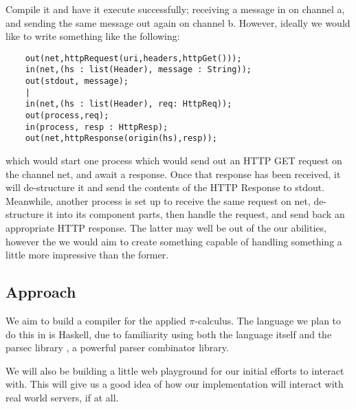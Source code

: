 Compile it and have it execute successfully; receiving a message in on channel a, and sending the same message out again on channel b. However, ideally we would like to write something like the following:
\begin{verbatim}
    out(net,httpRequest(uri,headers,httpGet()));
    in(net,(hs : list(Header), message : String));
    out(stdout, message);
    |
    in(net,(hs : list(Header), req: HttpReq));
    out(process,req);
    in(process, resp : HttpResp);
    out(net,httpResponse(origin(hs),resp));
\end{verbatim}

which would start one process which would send out an HTTP GET request on the channel net, and await a response. Once that response has been received, it will de-structure it and send the contents of the HTTP Response to stdout. Meanwhile, another process is set up to receive the same request on net, de-structure it into its component parts, then handle the request, and send back an appropriate HTTP response. The latter may well be out of the our abilities, however the we would aim to create something capable of handling something a little more impressive than the former.

\subsection{Approach}

We aim to build a compiler for the applied $\pi$-calculus. The language we plan to do this in is Haskell, due to familiarity using both the language itself and the parsec library \cite{lm01}, a powerful parser combinator library. 

We will also be building a little web playground for our initial efforts to interact with. This will give us a good idea of how our implementation will interact with real world servers, if at all. 


